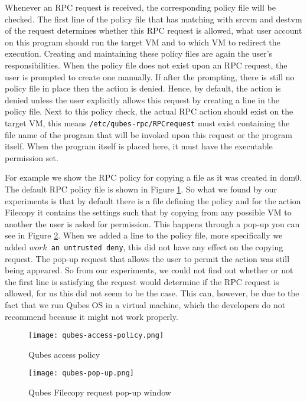 \documentclass[runningheads,a4paper]{article}
\begin{document}
Whenever an RPC request is received, the corresponding policy file will
be checked. The first line of the policy file that has matching with srcvm
and destvm of the request determines whether this RPC request is
allowed, what user account on this program should run the target VM 
and to which VM to redirect the execution. Creating and maintaining
these policy files are again the user's responsibilities. When the
policy file does not exist upon an RPC request, the user is prompted to
create one manually. If after the prompting, there is still no policy
file in place then the action is denied. Hence, by default, the action
is denied unless the user explicitly allows this request by creating
a line in the policy file. Next to this policy check,
the actual RPC action should exist on the target VM, this means
\texttt{/etc/qubes-rpc/RPCrequest} must exist containing the file name
of the program that will be invoked upon this request or the
program itself. When the program itself is placed here, it must have
the executable permission set. %

For example we show the RPC policy for copying a file as it was created
in dom0. The default RPC policy file is shown in Figure \ref{fig:policy}. 
So what we found by our experiments is that by default there is a file defining the policy and for the action Filecopy it contains the settings such that by copying from any possible VM to another the user is asked for permission. This happens through a pop-up you can see in Figure \ref{fig:pop-up}. When we added a line to the policy file, more specifically we added \texttt{$work  $ an untrusted deny}, this did not have any effect on the copying request. The pop-up request that allows the user to permit the action was still being appeared. So from our experiments, we could not find out whether or not the first line is satisfying the request would determine if the RPC request is allowed, for us this did not seem to be the case. This can, however, be due to the fact that we run Qubes OS in a virtual machine, which the developers do not recommend because it might not work properly.

\begin{figure}[h]
 \centering
 \texttt{[image: qubes-access-policy.png]}
 \caption{Qubes access policy}
 \label{fig:policy}
\end{figure}
\begin{figure}[h]
 \centering
 \texttt{[image: qubes-pop-up.png]}
 \caption{Qubes Filecopy request pop-up window}
 \label{fig:pop-up}
\end{figure}
\end{document}
